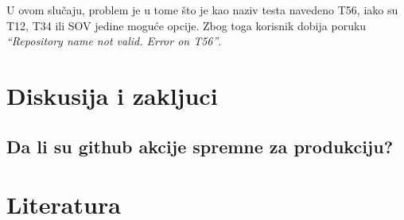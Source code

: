 \documentclass[12pt]{report}
\begin{document}
U ovom slučaju, problem je u tome što je kao naziv testa navedeno T56, iako su T12, T34 ili SOV jedine moguće opcije. Zbog toga korisnik dobija poruku \textit{``Repository name not valid. Error on T56''}.

\chapter{Diskusija i zakljuci}
\section{Da li su github akcije spremne za produkciju?}
\chapter{Literatura}
\sloppy
\printbibliography[heading=none]
\end{document}
